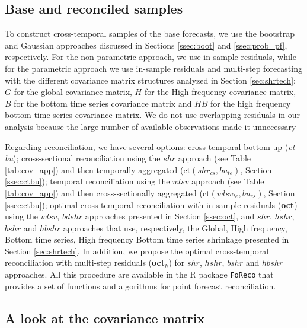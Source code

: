 \documentclass[a4paper,11pt]{article}
\theoremstyle{definition}
\begin{document}
\subsection{Base and reconciled samples}\label{ssec:sim_br}
To construct cross-temporal samples of the base forecasts, we use the bootstrap and Gaussian approaches discussed in Sections \ref{ssec:boot} and \ref{ssec:prob_pf}, respectively. For the non-parametric approach, we use in-sample residuals, while for the parametric approach we use in-sample residuals and multi-step forecasting with the different covariance matrix structures analyzed in Section \ref{sec:shrtech}: $G$ for the global covariance matrix, $H$ for the High frequency covariance matrix, $B$ for the bottom time series covariance matrix and $HB$ for the high frequency bottom time series covariance matrix. We do not use overlapping residuals in our analysis because the large number of available observations made it unnecessary %

Regarding reconciliation, we have several options: cross-temporal bottom-up (\textit{ct bu}); cross-sectional reconciliation using the $shr$ approach (see Table \ref{tab:cov_app}) and then temporally aggregated (ct$(shr_{cs}, bu_{te})$, Section \ref{ssec:ctbu});  temporal reconciliation using the $wlsv$ approach (see Table \ref{tab:cov_app}) and then cross-sectionally aggregated (ct$(wlsv_{te}, bu_{cs})$, Section \ref{ssec:ctbu}); optimal cross-temporal reconciliation \citep{difonzo2023} with in-sample residuals (\textbf{oct}) using the $wlsv$, $bdshr$ approaches presented in Section \ref{ssec:oct}, and $shr$, $hshr$, $bshr$ and $hbshr$ approaches that use, respectively, the Global, High frequency, Bottom time series, High frequency Bottom time series shrinkage presented in Section \ref{sec:shrtech}. In addition, we propose the optimal cross-temporal reconciliation with multi-step residuals (\textbf{oct$_h$}) for $shr$, $hshr$, $bshr$ and $hbshr$ approaches. All this procedure are available in the \textsf{R} package \texttt{FoReco} \citep{girolimetto2022} that provides a set of functions and algorithms for point forecast reconciliation.

\subsection{A look at the covariance matrix}
\end{document}
